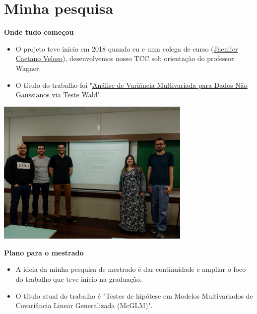 \documentclass[10pt,
  aspectratio=169,
  serif,
  mathserif,
  professionalfont,
  compress,
  handout,
  ]{beamer}\usepackage[]{graphicx}\usepackage[]{color}
\begin{document}

\section{Minha pesquisa}

\begin{frame}[c, allowframebreaks]
  
  \textbf{Onde tudo começou}
  
  \begin{itemize}

  \item O projeto teve início em 2018 quando eu e uma colega de curso (\href{https://br.linkedin.com/in/jhecaetano}{Jhenifer Caetano Veloso}), desenvolvemos nosso TCC sob orientação do professor Wagner. 

  \item O título do trabalho foi "\href{https://lineu96.github.io/st/projects/manova/}{Análise de Variância Multivariada para Dados Não Gaussianos via Teste Wald}".
  
  \end{itemize}

\end{frame}

\begin{frame}[c, allowframebreaks]

\begin{center}  
  \includegraphics[width=9.4cm]{img/tcc.jpg}  
\end{center}

\end{frame}

\begin{frame}[c, allowframebreaks]
  
  \textbf{Plano para o mestrado}
  
  \begin{itemize}
  
  \item A ideia da minha pesquisa de mestrado é dar continuidade e ampliar o foco do trabalho que teve início na graduação.
  
  \item O título atual do trabalho é "Testes de hipótese em Modelos Multivariados de Covariância Linear Generalizada (McGLM)".

  \end{itemize}

\end{frame}
\end{document}
